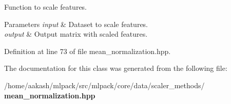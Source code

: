 Function to scale features. 


\begin{DoxyParams}{Parameters}
{\em input} & Dataset to scale features. \\
\hline
{\em output} & Output matrix with scaled features. \\
\hline
\end{DoxyParams}


Definition at line 73 of file mean\+\_\+normalization.\+hpp.



The documentation for this class was generated from the following file\+:\begin{DoxyCompactItemize}
\item 
/home/aakash/mlpack/src/mlpack/core/data/scaler\+\_\+methods/\textbf{ mean\+\_\+normalization.\+hpp}\end{DoxyCompactItemize}
